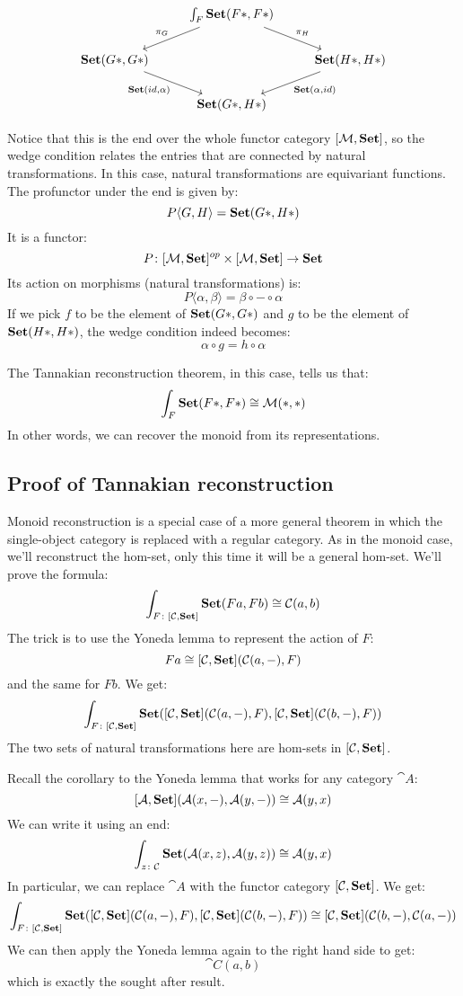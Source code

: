 \documentclass[DaoFP]{subfiles}
\begin{document}
\[
 \begin{tikzcd}
 & \int_F \Set (F *, F *)
 \arrow[dl, "\pi_G"']
 \arrow[dr, "\pi_H"]
 \\
 \Set(G *, G *)
 \arrow[dr, "{\Set(id, \alpha)}"']
 && \Set (H *, H *)
  \arrow[dl, "{\Set (\alpha, id)}"]
\\
 & \Set (G *, H *)
 \end{tikzcd}
\]

Notice that this is the end over the whole functor category $[\mathcal{M}, \mathbf{Set} ]$, so the wedge condition relates the entries that are connected by natural transformations. In this case, natural transformations are equivariant functions. The profunctor under the end is given by:
\[ P \langle G, H \rangle = \mathbf{Set} (G *, H *) \]
It is a functor:
\[ P \colon [\mathcal{M}, \mathbf{Set}]^{op} \times [\mathcal{M}, \mathbf{Set}] \to \mathbf{Set} \]
Its action on morphisms (natural transformations) is:
\[ P \langle \alpha, \beta \rangle = \beta \circ - \circ \alpha \]
If we pick $f$ to be the element of $\mathbf{Set} (G*, G*)$ and $g$ to be the element of $\mathbf{Set} (H*, H*)$, the wedge condition indeed becomes:
\[ \alpha \circ g = h \circ \alpha \]

The Tannakian reconstruction theorem, in this case, tells us that:
\[ \int_F \mathbf{Set}(F *, F *) \cong \mathcal{M} (*, *) \]
In other words, we can recover the monoid from its representations.

\subsection{Proof of Tannakian reconstruction}

Monoid reconstruction is a special case of a more general theorem in which the single-object category is replaced with a regular category. As in the monoid case, we'll reconstruct the hom-set, only this time it will be a general hom-set. We'll prove the formula:
\[ \int_{F \colon [\mathcal{C}, \mathbf{Set}]} \mathbf{Set} (F a, F b) \cong \mathcal{C}(a, b) \]
The trick is to use the Yoneda lemma to represent the action of $F$:
\[ F a \cong [\mathcal{C}, \mathbf{Set}] ( \mathcal{C} (a ,-), F) \]
and the same for $F b$. We get:
\[ \int_{F \colon [\mathcal{C}, \mathbf{Set}]} \mathbf{Set} ([\mathcal{C}, \mathbf{Set}] ( \mathcal{C} (a ,-), F), [\mathcal{C}, \mathbf{Set}] ( \mathcal{C} (b ,-), F)) \]
The two sets of natural transformations here are hom-sets in $[\mathcal{C}, \mathbf{Set}]$. 

Recall the corollary to the Yoneda lemma that works for any category $\cat A$:
\[ [\mathcal{A}, \mathbf{Set}] (\mathcal{A} (x, -), \mathcal{A} (y, -)) \cong \mathcal{A} (y, x) \]
We can write it using an end:
\[ \int_{z \colon \mathcal{C}} \mathbf{Set} (\mathcal{A} (x, z), \mathcal{A} (y, z)) \cong \mathcal{A} (y, x) \]
In particular, we can replace $\cat A$ with the functor category $[\mathcal{C}, \mathbf{Set}]$. We get:
\[ \int_{F \colon [\mathcal{C}, \mathbf{Set}]} \mathbf{Set} ([\mathcal{C}, \mathbf{Set}] ( \mathcal{C} (a ,-), F), [\mathcal{C}, \mathbf{Set}] ( \mathcal{C} (b ,-), F)) \cong [\mathcal{C}, \mathbf{Set}](\mathcal{C} (b ,-), \mathcal{C} (a ,-))\]
We can then apply the Yoneda lemma again to the right hand side to get:
\[ \cat C (a, b) \]
which is exactly the sought after result.
\end{document}
